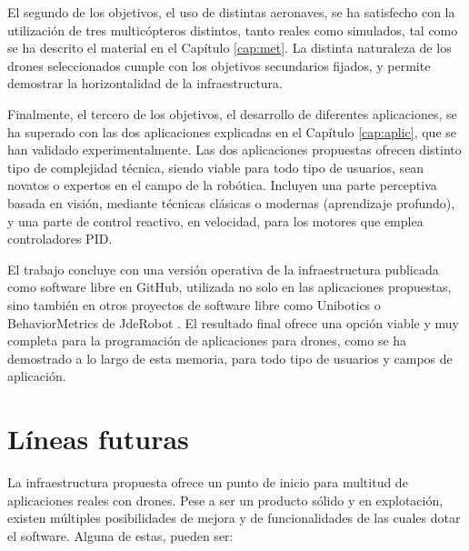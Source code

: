 \documentclass[../main.tex]{subfiles}
\begin{document}
El segundo de los objetivos, el uso de distintas aeronaves, se ha satisfecho con la utilización de tres multicópteros distintos, tanto reales como simulados, tal como se ha descrito el material en el Capítulo \ref{cap:met}. La distinta naturaleza de los drones seleccionados cumple con los objetivos secundarios fijados, y permite demostrar la horizontalidad de la infraestructura.

Finalmente, el tercero de los objetivos, el desarrollo de diferentes aplicaciones, se ha superado con las dos aplicaciones explicadas en el Capítulo \ref{cap:aplic}, que se han validado experimentalmente. Las dos aplicaciones propuestas ofrecen distinto tipo de complejidad técnica, siendo viable para todo tipo de usuarios, sean novatos o expertos en el campo de la robótica. Incluyen una parte perceptiva basada en visión, mediante técnicas clásicas o modernas (aprendizaje profundo), y una parte de control reactivo, en velocidad, para los motores que emplea controladores PID. 

El trabajo concluye con una versión operativa de la infraestructura publicada como software libre en GitHub, utilizada no solo en las aplicaciones propuestas, sino también en otros proyectos de software libre como Unibotics \cite{unibotics} o BehaviorMetrics \cite{behavior-metrics} de JdeRobot \cite{jderobot}. El resultado final ofrece una opción viable y muy completa para la programación de aplicaciones para drones, como se ha demostrado a lo largo de esta memoria, para todo tipo de usuarios y campos de aplicación.

\section{Líneas futuras} \label{section:fut}
La infraestructura propuesta ofrece un punto de inicio para multitud de aplicaciones reales con drones. Pese a ser un producto sólido y en explotación, existen múltiples posibilidades de mejora y de funcionalidades de las cuales dotar el software. Alguna de estas, pueden ser:
\end{document}
